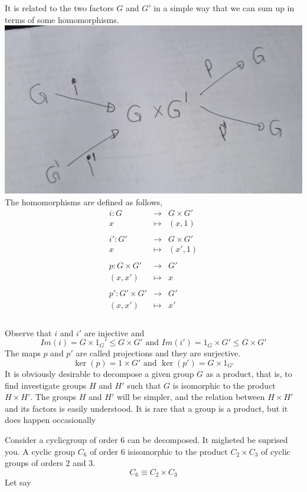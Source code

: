 \documentclass[
]{book}
\begin{document}
It is related to the two factors \(G\) and \(G'\) in a simple way that
we can sum up in terms of some homomorphisms.
\includegraphics{figures/ch_2/fig01.jpg} The homomorphisms are defined
as follows, \begin{eqnarray}
i:G &\rightarrow& G \times G' \\
x &\mapsto& (x,1)\\\\
i':G' &\rightarrow& G \times G' \\
x &\mapsto& (x',1)\\\\
p:G \times G' &\rightarrow& G' \\
(x,x') &\mapsto& x\\\\
p':G' \times G' &\rightarrow& G' \\
(x,x') &\mapsto& x'\\\\
\end{eqnarray}

Observe that \(i\) and \(i'\) are injective and
\[Im(i)=G\times 1_G'\leq G\times G' \text{ and }Im(i')=1_G\times G'\leq G\times G'\]
The maps \(p\) and \(p '\) are called projections and they are
surjective. \[\ker(p)=1\times G'\text{ and }\ker(p')=G\times 1_{G'}\] It
is obviously desirable to decompose a given group \(G\) as a product,
that is, to find investigate groups \(H\) and \(H '\) such that \(G\) is
isomorphic to the product \(H \times H'\). The groups \(H\) and \(H'\)
will be simpler, and the relation between \(H\times H'\) and its factors
is easily understood. It is rare that a group is a product, but it does
happen occasionally

\leavevmode{}%
Consider a cyclicgroup of order \(6\) can be decomposed. It migheted be
suprised you. A cyclic group \(C_6\) of order \(6\) isisomorphic to the
product \(C_2 \times C_3\) of cyclic groups of orders \(2\) and \(3\).
\[C_6\equiv C_2 \times C_3\] Let say
\end{document}

